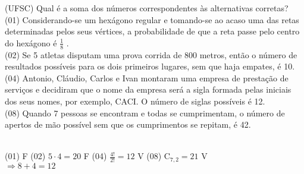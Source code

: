 \begin{ex}
 (UFSC) Qual é a soma dos números correspondentes às alternativas corretas?\\
(01) Considerando-se um hexágono regular e tomando-se ao acaso uma das retas determinadas pelos seus vértices, a probabilidade de que a reta passe pelo centro do hexágono é $\frac{1}{8}$ .\\
(02) Se 5 atletas disputam uma prova corrida de 800 metros, então o número de resultados possíveis para os dois primeiros lugares, sem que haja empates, é 10.\\
(04) Antonio, Cláudio, Carlos e Ivan montaram uma empresa de prestação de serviços e decidiram que o nome da empresa será a sigla formada pelas iniciais dos seus nomes, por exemplo, CACI. O número de siglas possíveis é 12.\\
(08) Quando 7 pessoas se encontram e todas se cumprimentam, o número de apertos de mão possível sem que os cumprimentos se repitam, é 42.
  \begin{sol}
    \phantom{A}  \\
   (01) F \hspace{0.3cm} (02) $5\cdot4=20$ F\hspace{0.3cm} (04) $\frac{4!}{2!}=12$  V \hspace{0.3cm} (08) $\mathrm{C}_{7,2}=21$ V\\
   $\Longrightarrow 8+4=12$
  \end{sol}
\end{ex}